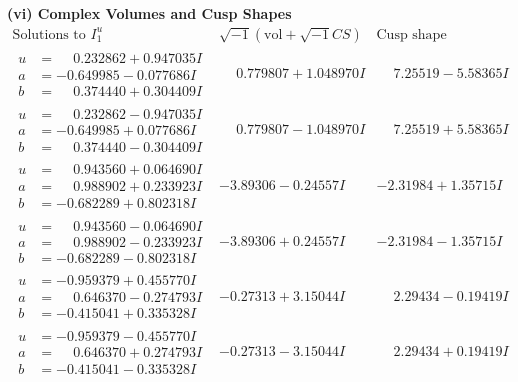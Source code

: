 \documentclass[1p]{elsarticle_modified}
\theoremstyle{definition}
\newcommand{\I}{\sqrt{-1}}
\begin{document}
\newpage\flushleft \textbf{(vi) Complex Volumes and Cusp Shapes}
$$\begin{array}{c|c|c}  
\text{Solutions to }I^u_{1}& \I (\text{vol} + \sqrt{-1}CS) & \text{Cusp shape}\\
 \hline 
\begin{aligned}
u &= \phantom{-}0.232862 + 0.947035 I \\
a &= -0.649985 - 0.077686 I \\
b &= \phantom{-}0.374440 + 0.304409 I\end{aligned}
 & \phantom{-}0.779807 + 1.048970 I & \phantom{-}7.25519 - 5.58365 I \\ \hline\begin{aligned}
u &= \phantom{-}0.232862 - 0.947035 I \\
a &= -0.649985 + 0.077686 I \\
b &= \phantom{-}0.374440 - 0.304409 I\end{aligned}
 & \phantom{-}0.779807 - 1.048970 I & \phantom{-}7.25519 + 5.58365 I \\ \hline\begin{aligned}
u &= \phantom{-}0.943560 + 0.064690 I \\
a &= \phantom{-}0.988902 + 0.233923 I \\
b &= -0.682289 + 0.802318 I\end{aligned}
 & -3.89306 - 0.24557 I & -2.31984 + 1.35715 I \\ \hline\begin{aligned}
u &= \phantom{-}0.943560 - 0.064690 I \\
a &= \phantom{-}0.988902 - 0.233923 I \\
b &= -0.682289 - 0.802318 I\end{aligned}
 & -3.89306 + 0.24557 I & -2.31984 - 1.35715 I \\ \hline\begin{aligned}
u &= -0.959379 + 0.455770 I \\
a &= \phantom{-}0.646370 - 0.274793 I \\
b &= -0.415041 + 0.335328 I\end{aligned}
 & -0.27313 + 3.15044 I & \phantom{-}2.29434 - 0.19419 I \\ \hline\begin{aligned}
u &= -0.959379 - 0.455770 I \\
a &= \phantom{-}0.646370 + 0.274793 I \\
b &= -0.415041 - 0.335328 I\end{aligned}
 & -0.27313 - 3.15044 I & \phantom{-}2.29434 + 0.19419 I \\ \hline\begin{aligned}

\end{aligned}
\end{array}$$
\end{document}
